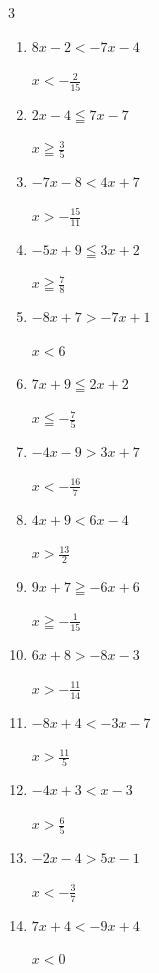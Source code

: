 \begin{multicols}{3}
\begin{enumerate}
        $\displaystyle x\geqq -\frac{4}{5}$

  \item $8x-2<-7x-4$

        $\displaystyle x<-\frac{2}{15}$

  \item $2x-4\leqq 7x-7$

        $\displaystyle x\geqq \frac{3}{5}$

  \item $-7x-8<4x+7$

        $\displaystyle x>-\frac{15}{11}$

  \item $-5x+9\leqq 3x+2$

        $\displaystyle x\geqq \frac{7}{8}$

  \item $-8x+7>-7x+1$

        $\displaystyle x<6$

  \item $7x+9\leqq 2x+2$

        $\displaystyle x\leqq -\frac{7}{5}$

  \item $-4x-9>3x+7$

        $\displaystyle x<-\frac{16}{7}$

  \item $4x+9<6x-4$

        $\displaystyle x>\frac{13}{2}$

  \item $9x+7\geqq -6x+6$

        $\displaystyle x\geqq -\frac{1}{15}$

  \item $6x+8>-8x-3$

        $\displaystyle x>-\frac{11}{14}$

  \item $-8x+4<-3x-7$

        $\displaystyle x>\frac{11}{5}$

  \item $-4x+3<x-3$

        $\displaystyle x>\frac{6}{5}$

  \item $-2x-4>5x-1$

        $\displaystyle x<-\frac{3}{7}$

  \item $7x+4<-9x+4$

        $\displaystyle x<0$


\end{enumerate}
\end{multicols}
